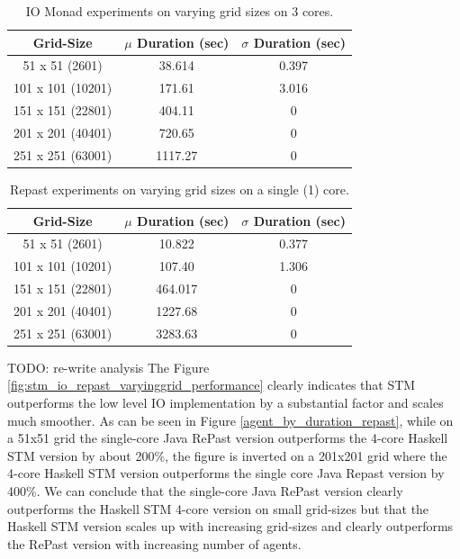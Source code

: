 \begin{table}
	\centering
  	\begin{tabular}{ c || c | c }
        Grid-Size         & $\mu$ Duration (sec) & $\sigma$ Duration (sec) \\ \hline \hline 
   		51 x 51   (2601)  & 38.614 				 & 0.397 \\ \hline
   		101 x 101 (10201) & 171.61 				 & 3.016 \\ \hline
   		151 x 151 (22801) & 404.11				 & 0 \\ \hline
   		201 x 201 (40401) & 720.65 				 & 0 \\ \hline 
   		251 x 251 (63001) & 1117.27 			 & 0 \\ \hline 
  	\end{tabular}
  	
  	\caption{IO Monad experiments on varying grid sizes on 3 cores.}
	\label{tab:varyinggrid_constcores3_IO}
\end{table}

\begin{table}
	\centering
  	\begin{tabular}{ c || c | c }
        Grid-Size         & $\mu$ Duration (sec) & $\sigma$ Duration (sec) \\ \hline \hline 
   		51 x 51   (2601)  & 10.822 				 & 0.377 \\ \hline
   		101 x 101 (10201) & 107.40 				 & 1.306 \\ \hline
   		151 x 151 (22801) & 464.017      		 & 0 \\ \hline
   		201 x 201 (40401) & 1227.68 			 & 0 \\ \hline 
   		251 x 251 (63001) & 3283.63				 & 0 \\ \hline 
  	\end{tabular}
  	
  	\caption{Repast experiments on varying grid sizes on a single (1) core.}
	\label{tab:varyinggrid_constcores_repast}
\end{table}

TODO: re-write analysis
The Figure \ref{fig:stm_io_repast_varyinggrid_performance} clearly indicates that STM outperforms the low level IO implementation by a substantial factor and scales much smoother. As can be seen in Figure \ref{agent_by_duration_repast}, while on a 51x51 grid the single-core Java RePast version outperforms the 4-core Haskell STM version by about 200\%, the figure is inverted on a 201x201 grid where the 4-core Haskell STM version outperforms the single core Java Repast version by 400\%. We can conclude that the single-core Java RePast version clearly outperforms the Haskell STM 4-core version on small grid-sizes but that the Haskell STM version scales up with increasing grid-sizes and clearly outperforms the RePast version with increasing number of agents.

